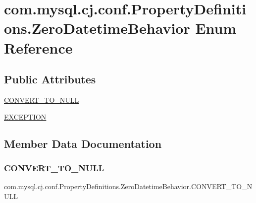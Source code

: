 \hypertarget{enumcom_1_1mysql_1_1cj_1_1conf_1_1_property_definitions_1_1_zero_datetime_behavior}{}\section{com.\+mysql.\+cj.\+conf.\+Property\+Definitions.\+Zero\+Datetime\+Behavior Enum Reference}
\label{enumcom_1_1mysql_1_1cj_1_1conf_1_1_property_definitions_1_1_zero_datetime_behavior}
\subsection*{Public Attributes}
\begin{DoxyCompactItemize}
\item 
\mbox{\hyperlink{enumcom_1_1mysql_1_1cj_1_1conf_1_1_property_definitions_1_1_zero_datetime_behavior_af7b02eb0955c75c9559565817299fc4e}{C\+O\+N\+V\+E\+R\+T\+\_\+\+T\+O\+\_\+\+N\+U\+LL}}
\item 
\mbox{\hyperlink{enumcom_1_1mysql_1_1cj_1_1conf_1_1_property_definitions_1_1_zero_datetime_behavior_a1ccf4f0a58ccb45121c8f1a1c78277eb}{E\+X\+C\+E\+P\+T\+I\+ON}}
\end{DoxyCompactItemize}


\subsection{Member Data Documentation}
\mbox{\label{enumcom_1_1mysql_1_1cj_1_1conf_1_1_property_definitions_1_1_zero_datetime_behavior_af7b02eb0955c75c9559565817299fc4e}} 
\subsubsection{\texorpdfstring{C\+O\+N\+V\+E\+R\+T\+\_\+\+T\+O\+\_\+\+N\+U\+LL}{CONVERT\_TO\_NULL}}
{\footnotesize\ttfamily com.\+mysql.\+cj.\+conf.\+Property\+Definitions.\+Zero\+Datetime\+Behavior.\+C\+O\+N\+V\+E\+R\+T\+\_\+\+T\+O\+\_\+\+N\+U\+LL}

